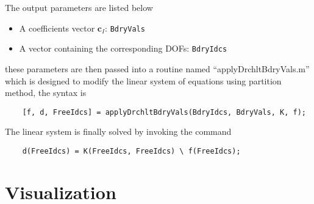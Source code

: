 The output parameters are listed below
\begin{itemize}
    \item A coefficients vector $\mathbf{c}_I$: \lstinline{BdryVals}
    \item A vector containing the corresponding DOFs: \lstinline{BdryIdcs}
\end{itemize}
these parameters are then passed into a routine named ``applyDrchltBdryVals.m'' which is designed to modify the linear system of equations using partition method, the syntax is
\begin{lstlisting}
    [f, d, FreeIdcs] = applyDrchltBdryVals(BdryIdcs, BdryVals, K, f);
\end{lstlisting}

The linear system is finally solved by invoking the command
\begin{lstlisting}
    d(FreeIdcs) = K(FreeIdcs, FreeIdcs) \ f(FreeIdcs);
\end{lstlisting}
\section{Visualization}


